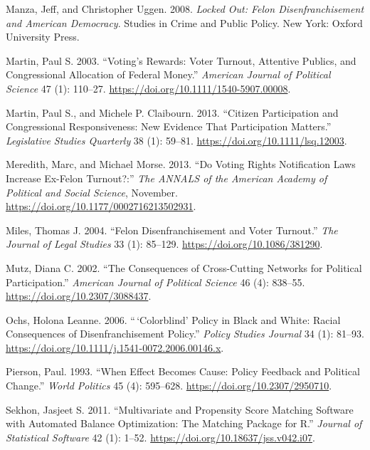 \documentclass[
  12pt,
]{article}
\newlength{\cslhangindent}
\newenvironment{cslreferences}%
  {\setlength{\parindent}{0pt}%
  \everypar{\setlength{\hangindent}{\cslhangindent}}\ignorespaces}%
  {\par}
\begin{document}
\begin{cslreferences}
\leavevmode\hypertarget{ref-locked_out}{}%
Manza, Jeff, and Christopher Uggen. 2008. \emph{Locked Out: Felon Disenfranchisement and American Democracy}. Studies in Crime and Public Policy. New York: Oxford University Press.

\leavevmode\hypertarget{ref-Martin2003}{}%
Martin, Paul S. 2003. ``Voting's Rewards: Voter Turnout, Attentive Publics, and Congressional Allocation of Federal Money.'' \emph{American Journal of Political Science} 47 (1): 110--27. \url{https://doi.org/10.1111/1540-5907.00008}.

\leavevmode\hypertarget{ref-Martin2013}{}%
Martin, Paul S., and Michele P. Claibourn. 2013. ``Citizen Participation and Congressional Responsiveness: New Evidence That Participation Matters.'' \emph{Legislative Studies Quarterly} 38 (1): 59--81. \url{https://doi.org/10.1111/lsq.12003}.

\leavevmode\hypertarget{ref-Meredith2013}{}%
Meredith, Marc, and Michael Morse. 2013. ``Do Voting Rights Notification Laws Increase Ex-Felon Turnout?:'' \emph{The ANNALS of the American Academy of Political and Social Science}, November. \url{https://doi.org/10.1177/0002716213502931}.

\leavevmode\hypertarget{ref-Miles2004}{}%
Miles, Thomas J. 2004. ``Felon Disenfranchisement and Voter Turnout.'' \emph{The Journal of Legal Studies} 33 (1): 85--129. \url{https://doi.org/10.1086/381290}.

\leavevmode\hypertarget{ref-Mutz2002}{}%
Mutz, Diana C. 2002. ``The Consequences of Cross-Cutting Networks for Political Participation.'' \emph{American Journal of Political Science} 46 (4): 838--55. \url{https://doi.org/10.2307/3088437}.

\leavevmode\hypertarget{ref-Ochs2006}{}%
Ochs, Holona Leanne. 2006. ``\,`Colorblind' Policy in Black and White: Racial Consequences of Disenfranchisement Policy.'' \emph{Policy Studies Journal} 34 (1): 81--93. \url{https://doi.org/10.1111/j.1541-0072.2006.00146.x}.

\leavevmode\hypertarget{ref-Pierson1993}{}%
Pierson, Paul. 1993. ``When Effect Becomes Cause: Policy Feedback and Political Change.'' \emph{World Politics} 45 (4): 595--628. \url{https://doi.org/10.2307/2950710}.

\leavevmode\hypertarget{ref-Sekhon2011}{}%
Sekhon, Jasjeet S. 2011. ``Multivariate and Propensity Score Matching Software with Automated Balance Optimization: The Matching Package for R.'' \emph{Journal of Statistical Software} 42 (1): 1--52. \url{https://doi.org/10.18637/jss.v042.i07}.


\end{cslreferences}
\end{document}
